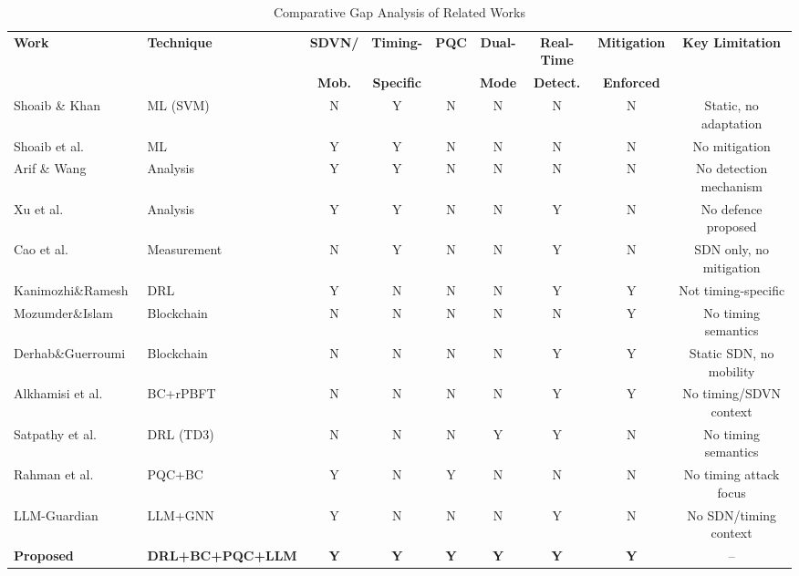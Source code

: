 \begin{table}[!t]
\renewcommand{\arraystretch}{1.1}
\caption{Comparative Gap Analysis of Related Works}
\label{tab:gap}
\centering
\tiny
\setlength{\tabcolsep}{4pt}
\begin{tabular}{llccccccc}
\hline
\textbf{Work} & \textbf{Technique} &
\textbf{SDVN/} & \textbf{Timing-} & \textbf{PQC} &
\textbf{Dual-} & \textbf{Real-Time} & \textbf{Mitigation} &
\textbf{Key Limitation} \\
& & \textbf{Mob.} & \textbf{Specific} & &
\textbf{Mode} & \textbf{Detect.} & \textbf{Enforced} & \\
\hline
Shoaib \& Khan~\cite{Shoaib2023Detection}    & ML (SVM)       & N & Y & N & N & N & N & Static, no adaptation    \\
Shoaib et al.~\cite{Shoaib2021Timing}    & ML             & Y & Y & N & N & N & N & No mitigation            \\
Arif \& Wang~\cite{Arif2019Timing}     & Analysis       & Y & Y & N & N & N & N & No detection mechanism   \\
Xu et al.~\cite{Xu2015Race}         & Analysis       & Y & Y & N & N & Y & N & No defence proposed      \\
Cao et al.~\cite{Cao2018CrossPath}       & Measurement    & N & Y & N & N & Y & N & SDN only, no mitigation  \\
Kanimozhi\&Ramesh~\cite{Kanimozhi2022DRL}& DRL            & Y & N & N & N & Y & Y & Not timing-specific       \\
Mozumder\&Islam~\cite{Mozumder2020Blockchain}   & Blockchain     & N & N & N & N & N & Y & No timing semantics       \\
Derhab\&Guerroumi~\cite{Derhab2021BMC}& Blockchain     & N & N & N & N & Y & Y & Static SDN, no mobility  \\
Alkhamisi et al.~\cite{alkhamisi2024bcs} & BC+rPBFT & N & N & N & N & Y & Y & No timing/SDVN context \\
Satpathy et al.~\cite{satpathy2025cloud} & DRL (TD3)& N & N & N & Y & Y & N & No timing semantics \\
Rahman et al.~\cite{rahman2025quantum}   & PQC+BC   & Y & N & Y & N & N & N & No timing attack focus  \\
LLM-Guardian~\cite{llmguardian2026}      & LLM+GNN  & Y & N & N & N & Y & N & No SDN/timing context   \\
\hline
\textbf{Proposed} & \textbf{DRL+BC+PQC+LLM} &
\textbf{Y} & \textbf{Y} & \textbf{Y} & \textbf{Y} & \textbf{Y} & \textbf{Y} & -- \\
\hline
\end{tabular}
\end{table}


